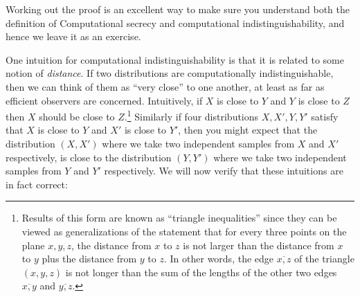 \hypertarget{compindsecthm}{}

Working out the proof is an excellent way to make sure you understand
both the definition of Computational secrecy and computational
indistinguishability, and hence we leave it as an exercise.

One intuition for computational indistinguishability is that it is
related to some notion of \emph{distance}. If two distributions are
computationally indistinguishable, then we can think of them as ``very
close'' to one another, at least as far as efficient observers are
concerned. Intuitively, if \(X\) is close to \(Y\) and \(Y\) is close to
\(Z\) then \(X\) should be close to \(Z\).\footnote{Results of this form
  are known as ``triangle inequalities'' since they can be viewed as
  generalizations of the statement that for every three points on the
  plane \(x,y,z\), the distance from \(x\) to \(z\) is not larger than
  the distance from \(x\) to \(y\) plus the distance from \(y\) to
  \(z\). In other words, the edge \(\overline{x,z}\) of the triangle
  \((x,y,z)\) is not longer than the sum of the lengths of the other two
  edges \(\overline{x,y}\) and \(\overline{y,z}\).} Similarly if four
distributions \(X,X',Y,Y'\) satisfy that \(X\) is close to \(Y\) and
\(X'\) is close to \(Y'\), then you might expect that the distribution
\((X,X')\) where we take two independent samples from \(X\) and \(X'\)
respectively, is close to the distribution \((Y,Y')\) where we take two
independent samples from \(Y\) and \(Y'\) respectively. We will now
verify that these intuitions are in fact correct:

\hypertarget{triangleeqthm}{}

